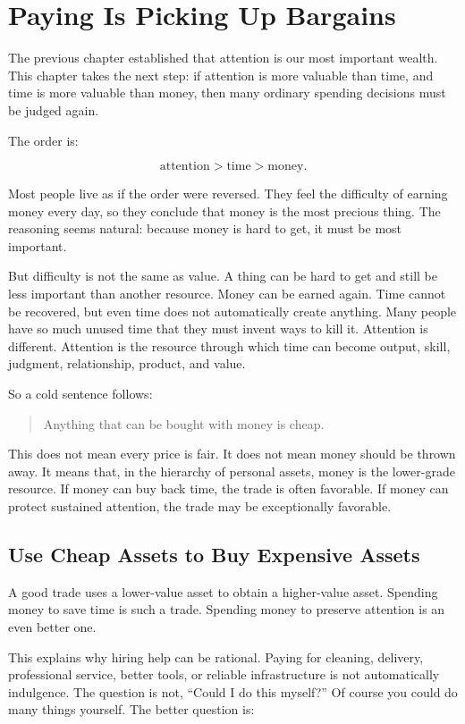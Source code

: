 \chapter{Paying Is Picking Up Bargains}

The previous chapter established that attention is our most important wealth. This chapter takes the next step: if attention is more valuable than time, and time is more valuable than money, then many ordinary spending decisions must be judged again.

The order is:

\[
\mathrm{attention}>\mathrm{time}>\mathrm{money}.
\]

Most people live as if the order were reversed. They feel the difficulty of earning money every day, so they conclude that money is the most precious thing. The reasoning seems natural: because money is hard to get, it must be most important.

But difficulty is not the same as value. A thing can be hard to get and still be less important than another resource. Money can be earned again. Time cannot be recovered, but even time does not automatically create anything. Many people have so much unused time that they must invent ways to kill it. Attention is different. Attention is the resource through which time can become output, skill, judgment, relationship, product, and value.

So a cold sentence follows:

\begin{quote}
Anything that can be bought with money is cheap.
\end{quote}

This does not mean every price is fair. It does not mean money should be thrown away. It means that, in the hierarchy of personal assets, money is the lower-grade resource. If money can buy back time, the trade is often favorable. If money can protect sustained attention, the trade may be exceptionally favorable.

\section*{Use Cheap Assets to Buy Expensive Assets}

A good trade uses a lower-value asset to obtain a higher-value asset. Spending money to save time is such a trade. Spending money to preserve attention is an even better one.

This explains why hiring help can be rational. Paying for cleaning, delivery, professional service, better tools, or reliable infrastructure is not automatically indulgence. The question is not, ``Could I do this myself?'' Of course you could do many things yourself. The better question is:

